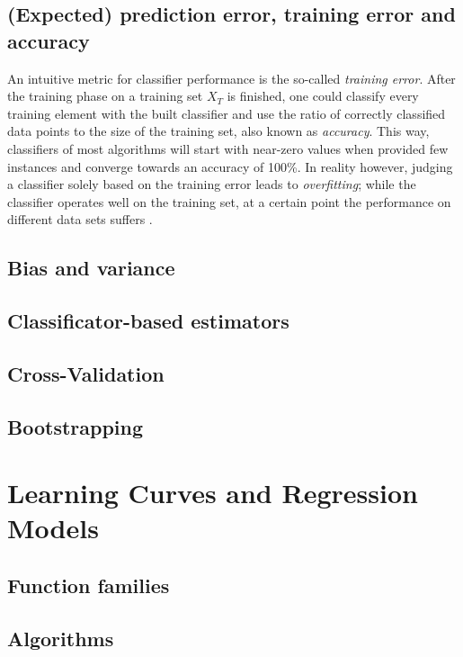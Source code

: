 \subsection{(Expected) prediction error, training error and accuracy}
An intuitive metric for classifier performance is the so-called \textit{training error}. After the training phase on a training set $X_T$ is finished, one could classify every training element with the built classifier and use the ratio of correctly classified data points to the size of the training set, also known as \textit{accuracy}. This way, classifiers of most algorithms will start with near-zero values when provided few instances and converge towards an accuracy of 100\%. In reality however, judging a classifier solely based on the training error leads to \textit{overfitting}; while the classifier operates well on the training set, at a certain point the performance on different data sets suffers \cite{Dietterich1995}.
\subsection{Bias and variance}

\subsection{Classificator-based estimators}

\subsection{Cross-Validation}

\subsection{Bootstrapping}

\section{Learning Curves and Regression Models}

\subsection{Function families}

\subsection{Algorithms}